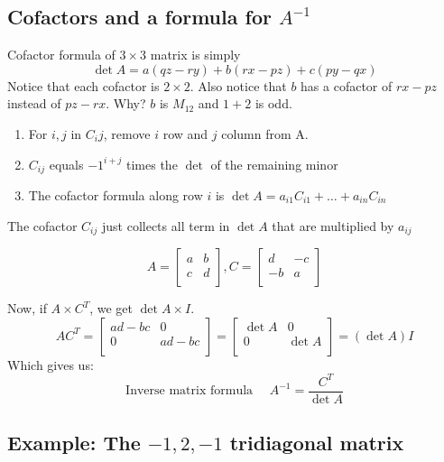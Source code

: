 \subsection{Cofactors and a formula for \(A^{-1} \) }

Cofactor formula of \(3 \times 3\) matrix is simply 
\[
  \det  A = a (qz - ry) + b (rx - pz) + c(py - qx)
\] 
Notice that each cofactor is \(2 \times 2\). Also notice that \(b\) has a cofactor of \(rx - pz\) instead of \(pz - rx\). Why? \(b\) is \(M_{12} \) and \(1 + 2\) is odd. 

\begin{enumerate}
  \item For \(i, j\) in \(C_ij\), remove \(i\) row and \(j\) column from A. 
  \item \(C_{ij}\) equals \(-1^{i+j}\) times the \(\det \) of the remaining minor 
  \item The cofactor formula along row \(i\) is \(\det  A = a_{i1}C_{i1} + \ldots + a_{in}C_{in}    \)  
\end{enumerate}

The cofactor \(C_{ij} \) just collects all term in \(\det A\) that are multiplied by \(a_{ij} \)

\[
  A = 
  \begin{bmatrix}
    a & b  \\
    c & d  \\
  \end{bmatrix}
  , C = 
  \begin{bmatrix}
    d & -c  \\
    -b & a  \\
  \end{bmatrix}
\]

Now, if \(A \times C^T\), we get \(\det A \times I\). 
\[
  AC^T = 
  \begin{bmatrix}
    ad-bc & 0  \\
    0 &  ad-bc \\
  \end{bmatrix}
  = 
  \begin{bmatrix}
    \det A &  0 \\
    0 & \det A  \\
  \end{bmatrix}
  = (\det A) I
\]  
Which gives us:
\[
  \text{Inverse matrix formula }
  \quad 
  A^{-1} = \frac{C^T}{\det A} 
\]

\subsection{Example: The \(-1, 2, -1\) tridiagonal matrix}

